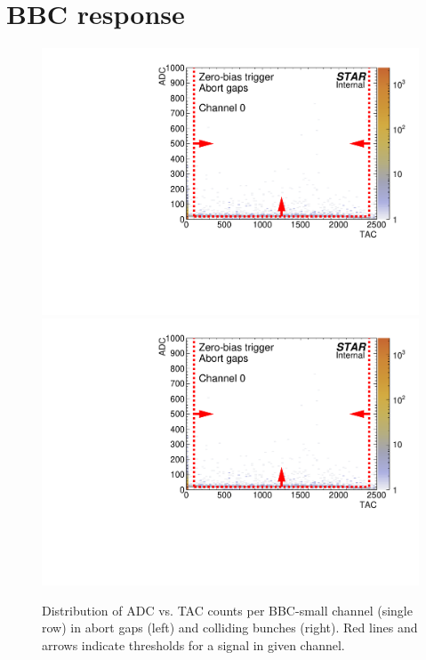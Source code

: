 
\chapter{BBC response}\label{appendix:bbc}

\begin{figure}[hb]
\caption[Distribution of ADC vs. TAC counts per BBC-small channel in abort gaps and colliding bunches.]{Distribution of ADC vs. TAC counts per BBC-small channel (single row) in abort gaps (left) and colliding bunches (right). Red lines and arrows indicate thresholds for a signal in given channel.}\label{fig:bbsSmallAdcVsTac}
\centering
\parbox{0.495\textwidth}{
  \centering
  \includegraphics[width=\linewidth,page=1]{graphics/eventSelection/bbc/Bbc_ADCvsTAC_abortGaps.pdf}\\
  \includegraphics[width=\linewidth,page=2]{graphics/eventSelection/bbc/Bbc_ADCvsTAC_abortGaps.pdf}\\
}
\end{figure}
